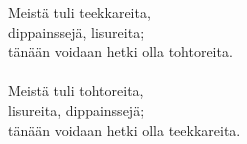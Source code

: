 
Meistä tuli teekkareita, \\ dippainssejä, lisureita; \\ tänään voidaan hetki olla tohtoreita. \\ \hspace{10mm} \\ Meistä tuli tohtoreita, \\ lisureita, dippainssejä; \\ tänään voidaan hetki olla teekkareita.